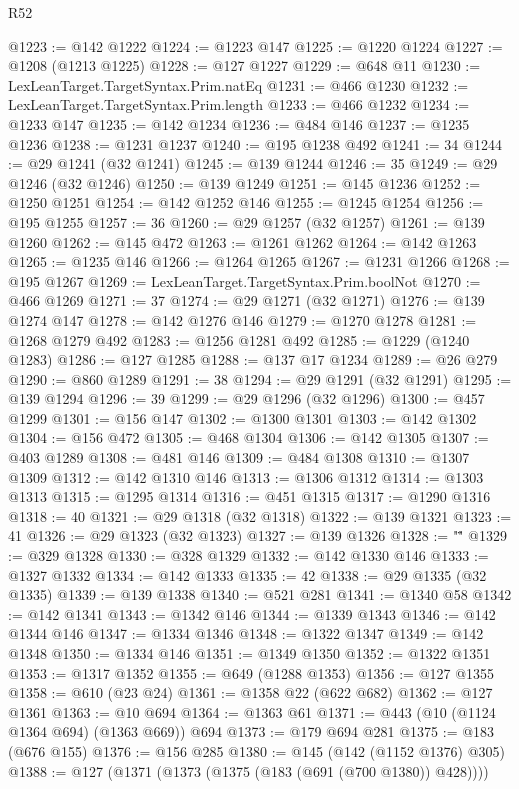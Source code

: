 \begin{lexlean}{R52}
\begin{coremodule}
{{{{{{{{{{{{{{{{{{{{{{{{{{{{{{{{{{{{{{{{{{{{{{{{{{{{{{{{{{{{{{{{{{{{{{{{{{{{{{{{{{{{{{{{{{{{{{{{{{{{{{{{{{{{{{{{{{{{{{{{{{{{{{{{{{{{{{{{{{{{{{{{{{{{{{{{{{{{{{{{{{{{{{{{{{{{{{{{{{{{{{{{{{{{{{{{{{{{{{@1223 := @142 @1222
@1224 := @1223 @147
@1225 := @1220 @1224
@1227 := @1208 (@1213 @1225)
@1228 := @127 @1227
@1229 := @648 @11
@1230 := LexLeanTarget.TargetSyntax.Prim.natEq
@1231 := @466 @1230
@1232 := LexLeanTarget.TargetSyntax.Prim.length
@1233 := @466 @1232
@1234 := @1233 @147
@1235 := @142 @1234
@1236 := @484 @146
@1237 := @1235 @1236
@1238 := @1231 @1237
@1240 := @195 @1238 @492
@1241 := 34
@1244 := @29 @1241 (@32 @1241)
@1245 := @139 @1244
@1246 := 35
@1249 := @29 @1246 (@32 @1246)
@1250 := @139 @1249
@1251 := @145 @1236
@1252 := @1250 @1251
@1254 := @142 @1252 @146
@1255 := @1245 @1254
@1256 := @195 @1255
@1257 := 36
@1260 := @29 @1257 (@32 @1257)
@1261 := @139 @1260
@1262 := @145 @472
@1263 := @1261 @1262
@1264 := @142 @1263
@1265 := @1235 @146
@1266 := @1264 @1265
@1267 := @1231 @1266
@1268 := @195 @1267
@1269 := LexLeanTarget.TargetSyntax.Prim.boolNot
@1270 := @466 @1269
@1271 := 37
@1274 := @29 @1271 (@32 @1271)
@1276 := @139 @1274 @147
@1278 := @142 @1276 @146
@1279 := @1270 @1278
@1281 := @1268 @1279 @492
@1283 := @1256 @1281 @492
@1285 := @1229 (@1240 @1283)
@1286 := @127 @1285
@1288 := @137 @17 @1234
@1289 := @26 @279
@1290 := @860 @1289
@1291 := 38
@1294 := @29 @1291 (@32 @1291)
@1295 := @139 @1294
@1296 := 39
@1299 := @29 @1296 (@32 @1296)
@1300 := @457 @1299
@1301 := @156 @147
@1302 := @1300 @1301
@1303 := @142 @1302
@1304 := @156 @472
@1305 := @468 @1304
@1306 := @142 @1305
@1307 := @403 @1289
@1308 := @481 @146
@1309 := @484 @1308
@1310 := @1307 @1309
@1312 := @142 @1310 @146
@1313 := @1306 @1312
@1314 := @1303 @1313
@1315 := @1295 @1314
@1316 := @451 @1315
@1317 := @1290 @1316
@1318 := 40
@1321 := @29 @1318 (@32 @1318)
@1322 := @139 @1321
@1323 := 41
@1326 := @29 @1323 (@32 @1323)
@1327 := @139 @1326
@1328 := "\""
@1329 := @329 @1328
@1330 := @328 @1329
@1332 := @142 @1330 @146
@1333 := @1327 @1332
@1334 := @142 @1333
@1335 := 42
@1338 := @29 @1335 (@32 @1335)
@1339 := @139 @1338
@1340 := @521 @281
@1341 := @1340 @58
@1342 := @142 @1341
@1343 := @1342 @146
@1344 := @1339 @1343
@1346 := @142 @1344 @146
@1347 := @1334 @1346
@1348 := @1322 @1347
@1349 := @142 @1348
@1350 := @1334 @146
@1351 := @1349 @1350
@1352 := @1322 @1351
@1353 := @1317 @1352
@1355 := @649 (@1288 @1353)
@1356 := @127 @1355
@1358 := @610 (@23 @24)
@1361 := @1358 @22 (@622 @682)
@1362 := @127 @1361
@1363 := @10 @694
@1364 := @1363 @61
@1371 := @443 (@10 (@1124 @1364 @694) (@1363 @669)) @694
@1373 := @179 @694 @281
@1375 := @183 (@676 @155)
@1376 := @156 @285
@1380 := @145 (@142 (@1152 @1376) @305)
@1388 := @127 (@1371 (@1373 (@1375 (@183 (@691 (@700 @1380)) @428))))
}}}}}}}}}}}}}}}}}}}}}}}}}}}}}}}}}}}}}}}}}}}}}}}}}}}}}}}}}}}}}}}}}}}}}}}}}}}}}}}}}}}}}}}}}}}}}}}}}}}}}}}}}}}}}}}}}}}}}}}}}}}}}}}}}}}}}}}}}}}}}}}}}}}}}}}}}}}}}}}}}}}}}}}}}}}}}}}}}}}}}}}}}}}}}}}}}}}}}}
\end{coremodule}
\end{lexlean}
